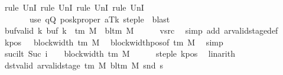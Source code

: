 \begin{isabellebody}
\ {\isacharparenleft}{\kern0pt}rule\ UnI{}{\isacharcomma}{\kern0pt}\ rule\ UnI{}{\isacharcomma}{\kern0pt}\ rule\ UnI{}{\isacharcomma}{\kern0pt}\ rule\ UnI{}{\isacharparenright}{\kern0pt}\isanewline
\ \ \ \ \ \ \ {\isacharparenleft}{\kern0pt}use\ qQ\ poskproper\ aTk\ step{\isacharunderscore}{\kern0pt}le\ \ blast{\isacharparenright}{\kern0pt}\isanewline
\ \ \isamarkupfalse%
\ buf{\isacharunderscore}{\kern0pt}valid{\isacharcolon}{\kern0pt}\ {\isachardoublequoteopen}{\isasymforall}k{\isachardot}{\kern0pt}\ buf\ k\ {\isasymin}\ {\isasymGamma}{\isacharunderscore}{\kern0pt}tm\ M\ {\isasymunion}\ {\isacharbraceleft}{\kern0pt}bl{\isacharunderscore}{\kern0pt}tm\ M{\isacharbraceright}{\kern0pt}{\isachardoublequoteclose}\isanewline
\ \ \ \ \isamarkupfalse%
\ vsrc\ \isamarkupfalse%
\ {\isacharparenleft}{\kern0pt}simp\ add{\isacharcolon}{\kern0pt}\ ar{\isacharunderscore}{\kern0pt}valid{\isacharunderscore}{\kern0pt}stage{\isacharunderscore}{\kern0pt}def{\isacharparenright}{\kern0pt}\isanewline
\ \ \isamarkupfalse%
\ kpos{\isacharcolon}{\kern0pt}\ {\isachardoublequoteopen}{}\ {\isacharless}{\kern0pt}\ block{\isacharunderscore}{\kern0pt}width\ {\isacharparenleft}{\kern0pt}{\isasymGamma}{\isacharunderscore}{\kern0pt}tm\ M{\isacharparenright}{\kern0pt}{\isachardoublequoteclose}\ \isamarkupfalse%
\ block{\isacharunderscore}{\kern0pt}width{\isacharunderscore}{\kern0pt}pos{\isacharbrackleft}{\kern0pt}of\ {\isachardoublequoteopen}{\isasymGamma}{\isacharunderscore}{\kern0pt}tm\ M{\isachardoublequoteclose}{\isacharbrackright}{\kern0pt}\ \isamarkupfalse%
\ simp\isanewline
\ \ \isamarkupfalse%
\ suc{\isacharunderscore}{\kern0pt}i{\isacharunderscore}{\kern0pt}lt{\isacharcolon}{\kern0pt}\ {\isachardoublequoteopen}Suc\ i\ {\isacharless}{\kern0pt}\ {}\ {\isacharasterisk}{\kern0pt}\ block{\isacharunderscore}{\kern0pt}width\ {\isacharparenleft}{\kern0pt}{\isasymGamma}{\isacharunderscore}{\kern0pt}tm\ M{\isacharparenright}{\kern0pt}{\isachardoublequoteclose}\isanewline
\ \ \ \ \isamarkupfalse%
\ step{\isacharunderscore}{\kern0pt}le\ kpos\ \isamarkupfalse%
\ linarith\isanewline
\ \ \isamarkupfalse%
\ dst{\isacharunderscore}{\kern0pt}valid{\isacharcolon}{\kern0pt}\ {\isachardoublequoteopen}ar{\isacharunderscore}{\kern0pt}valid{\isacharunderscore}{\kern0pt}stage\ {\isacharparenleft}{\kern0pt}{\isasymGamma}{\isacharunderscore}{\kern0pt}tm\ M{\isacharparenright}{\kern0pt}\ {\isacharparenleft}{\kern0pt}bl{\isacharunderscore}{\kern0pt}tm\ M{\isacharparenright}{\kern0pt}\ {\isacharparenleft}{\kern0pt}snd\ {\isacharquery}{\kern0pt}s{\isacharprime}{\kern0pt}{\isacharparenright}{\kern0pt}{\isachardoublequoteclose}\isanewline

\end{isabellebody}
